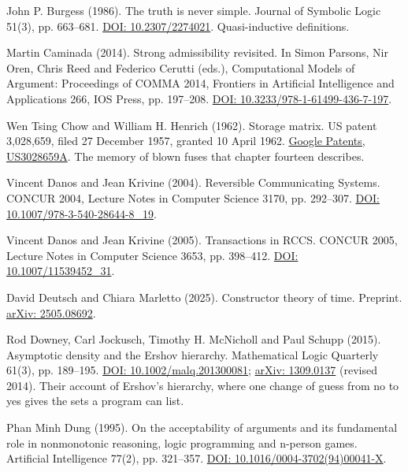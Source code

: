 \documentclass[11pt,twoside]{article}
\theoremstyle{thielethm}
\theoremstyle{thieledef}
\theoremstyle{thieledef}
\theoremstyle{thieledef}
\theoremstyle{thielethm}
\theoremstyle{thieleobs}
\theoremstyle{thielethm}
\begin{document}
\noindent John P. Burgess (1986). The truth is never simple. Journal of Symbolic Logic 51(3), pp. 663--681. \href{https://doi.org/10.2307/2274021}{DOI: 10.2307/2274021}. Quasi-inductive definitions.
\par\medskip

\noindent Martin Caminada (2014). Strong admissibility revisited. In Simon Parsons, Nir Oren, Chris Reed and Federico Cerutti (eds.), Computational Models of Argument: Proceedings of COMMA 2014, Frontiers in Artificial Intelligence and Applications 266, IOS Press, pp. 197--208. \href{https://doi.org/10.3233/978-1-61499-436-7-197}{DOI: 10.3233/978-1-61499-436-7-197}.
\par\medskip

\noindent Wen Tsing Chow and William H. Henrich (1962). Storage matrix. US patent 3,028,659, filed 27 December 1957, granted 10 April 1962. \href{https://patents.google.com/patent/US3028659A/en}{Google Patents, US3028659A}. The memory of blown fuses that chapter fourteen describes.
\par\medskip

\noindent Vincent Danos and Jean Krivine (2004). Reversible Communicating Systems. CONCUR 2004, Lecture Notes in Computer Science 3170, pp. 292--307. \href{https://doi.org/10.1007/978-3-540-28644-8_19}{DOI: 10.1007/978-3-540-28644-8\_19}.
\par\medskip

\noindent Vincent Danos and Jean Krivine (2005). Transactions in RCCS. CONCUR 2005, Lecture Notes in Computer Science 3653, pp. 398--412. \href{https://doi.org/10.1007/11539452_31}{DOI: 10.1007/11539452\_31}.
\par\medskip

\noindent David Deutsch and Chiara Marletto (2025). Constructor theory of time. Preprint. \href{https://arxiv.org/abs/2505.08692}{arXiv: 2505.08692}.
\par\medskip

\noindent Rod Downey, Carl Jockusch, Timothy H. McNicholl and Paul Schupp (2015). Asymptotic density and the Ershov hierarchy. Mathematical Logic Quarterly 61(3), pp. 189--195. \href{https://doi.org/10.1002/malq.201300081}{DOI: 10.1002/malq.201300081}; \href{https://arxiv.org/abs/1309.0137}{arXiv: 1309.0137} (revised 2014). Their account of Ershov's hierarchy, where one change of guess from no to yes gives the sets a program can list.
\par\medskip

\noindent Phan Minh Dung (1995). On the acceptability of arguments and its fundamental role in nonmonotonic reasoning, logic programming and n-person games. Artificial Intelligence 77(2), pp. 321--357. \href{https://doi.org/10.1016/0004-3702(94)00041-X}{DOI: 10.1016/0004-3702(94)00041-X}.
\par\medskip
\end{document}
